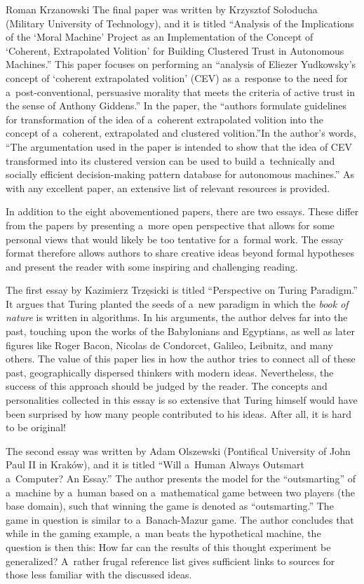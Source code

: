 \begin{editorialeng}{Roman Krzanowski}
The final paper was written by Krzysztof Sołoducha (Military University of Technology), and it is titled ``Analysis of the Implications of the ‘Moral Machine' Project as an Implementation of the Concept of ‘Coherent, Extrapolated Volition' for Building Clustered Trust in Autonomous Machines.'' This paper focuses on performing an ``analysis of Eliezer Yudkowsky's concept of ‘coherent extrapolated volition' (CEV) as a~response to the need for a~post-conventional, persuasive morality that meets the criteria of active trust in the sense of Anthony Giddens.'' In the paper, the ``authors formulate guidelines for transformation of the idea of a~coherent extrapolated volition into the concept of a~coherent, extrapolated and clustered volition.''In the author's words, ``The argumentation used in the paper is intended to show that the idea of CEV transformed into its clustered version can be used to build a~technically and socially efficient decision-making pattern database for autonomous machines.'' As with any excellent paper, an extensive list of relevant resources is provided.

In addition to the eight abovementioned papers, there are two essays. These differ from the papers by presenting a~more open perspective that allows for some personal views that would likely be too tentative for a~formal work. The essay format therefore allows authors to share creative ideas beyond formal hypotheses and present the reader with some inspiring and challenging reading.

The first essay by Kazimierz Trzęsicki is titled ``Perspective on Turing Paradigm.'' It argues that Turing planted the seeds of a~new paradigm in which the \textit{book of nature} is written in algorithms. In his arguments, the author delves far into the past, touching upon the works of the Babylonians and Egyptians, as well as later figures like Roger Bacon, Nicolas de Condorcet, Galileo, Leibnitz, and many others. The value of this paper lies in how the author tries to connect all of these past, geographically dispersed thinkers with modern ideas. Nevertheless, the success of this approach should be judged by the reader. The concepts and personalities collected in this essay is so extensive that Turing himself would have been surprised by how many people contributed to his ideas. After all, it is hard to be original!

The second essay was written by Adam Olszewski (Pontifical University of John Paul II in Kraków), and it is titled ``Will a~Human Always Outsmart a~Computer? An Essay.'' The author presents the model for the ``outsmarting'' of a~machine by a~human based on a~mathematical game between two players (the base domain), such that winning the game is denoted as ``outsmarting.'' The game in question is similar to a~Banach-Mazur game. The author concludes that while in the gaming example, a~man beats the hypothetical machine, the question is then this: How far can the results of this thought experiment be generalized? A~rather frugal reference list gives sufficient links to sources for those less familiar with the discussed ideas.


\end{editorialeng}
